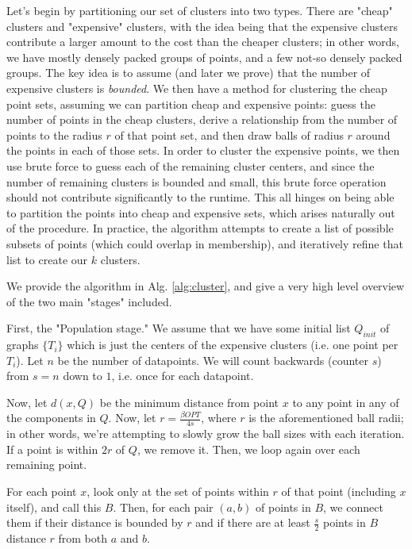 \documentclass[paper=a4, fontsize=10.5pt]{scrartcl} %
\numberwithin{equation}{section} %
\numberwithin{figure}{section} %
\numberwithin{table}{section} %
\begin{document}
Let's begin by partitioning our set of clusters into two types.  There are  "cheap" clusters and "expensive" clusters, with the idea being that the expensive clusters contribute a larger amount to the cost than the cheaper clusters; in other words, we have mostly densely packed groups of points, and a few not-so densely packed groups.  The key idea is to assume (and later we prove) that the number of expensive clusters is \emph{bounded}.  We then have a method for clustering the cheap point sets, assuming we can partition cheap and expensive points: guess the number of points in the cheap clusters, derive a relationship from the number of points to the radius $r$ of that point set, and then draw balls of radius $r$ around the points in each of those sets.  In order to cluster the expensive points, we then use brute force to guess each of the remaining cluster centers, and since the number of remaining clusters is bounded and small, this brute force operation should not contribute significantly to the runtime.  This all hinges on being able to partition the points into cheap and expensive sets, which arises naturally out of the procedure.  In practice, the algorithm attempts to create a list of possible subsets of points (which could overlap in membership), and iteratively refine that list to create our $k$ clusters. 



We provide the algorithm in Alg. \ref{alg:cluster}, and give a very high level overview of the two main "stages" included.

First, the "Population stage."  We assume that we have some initial list $Q_{init}$ of graphs $\{T_i\}$ which is just the centers of the expensive clusters (i.e. one point per $T_i$).  Let $n$ be the number of datapoints.  We will count backwards (counter $s$) from $s=n$ down to $1$, i.e. once for each datapoint.

Now, let $d(x, Q)$ be the minimum distance from point $x$ to any point in any of the components in $Q$.  Now, let $r = \frac{\beta OPT}{4 s}$, where $r$ is the aforementioned ball radii; in other words, we're attempting to slowly grow the ball sizes with each iteration.  If a point is within $2r$ of $Q$, we remove it. Then, we loop again over each remaining point.

For each point $x$, look only at the set of points within $r$ of that point (including $x$ itself), and call this $B$.  Then, for each pair $(a, b)$ of points in $B$, we connect them if their distance is bounded by $r$ and if there are at least $\frac{s}{2}$ points in $B$ distance $r$ from both $a$ and $b$.
\end{document}
